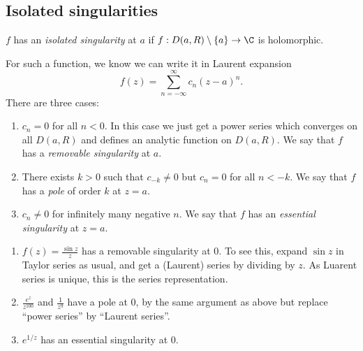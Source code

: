 \documentclass[a4paper]{article}
\begin{document}
\subsection{Isolated singularities}

\begin{definition}
  \(f\) has an \emph{isolated singularity} at \(a\) if \(f: D(a, R) \setminus \{a\} \to \C\) is holomorphic.
\end{definition}

For such a function, we know we can write it in Laurent expansion
\[
  f(z) = \sum_{n = -\infty}^\infty c_n(z - a)^n.
\]
There are three cases:

\begin{definition}\leavevmode
  \begin{enumerate}
  \item \(c_n = 0\) for all \(n < 0\). In this case we just get a power series which converges on all \(D(a, R)\) and defines an analytic function on \(D(a, R)\). We say that \(f\) has a \emph{removable singularity} at \(a\).
  \item There exists \(k > 0\) such that \(c_{-k} \neq 0\) but \(c_n = 0\) for all \(n < -k\). We say that \(f\) has a \emph{pole} of order \(k\) at \(z = a\).
  \item \(c_n \neq 0\) for infinitely many negative \(n\). We say that \(f\) has an \emph{essential singularity} at \(z = a\).
  \end{enumerate}
\end{definition}

\begin{eg}\leavevmode
  \begin{enumerate}
  \item \(f(z) = \frac{\sin z}{z}\) has a removable singularity at \(0\). To see this, expand \(\sin z\) in Taylor series as usual, and get a (Laurent) series by dividing by \(z\). As Luarent series is unique, this is the series representation.
  \item \(\frac{e^z}{z^{100}}\) and \(\frac{1}{z^9}\) have a pole at \(0\), by the same argument as above but replace ``power series'' by ``Laurent series''.
  \item \(e^{1/z}\) has an essential singularity at \(0\).
  \end{enumerate}
\end{eg}
\end{document}

